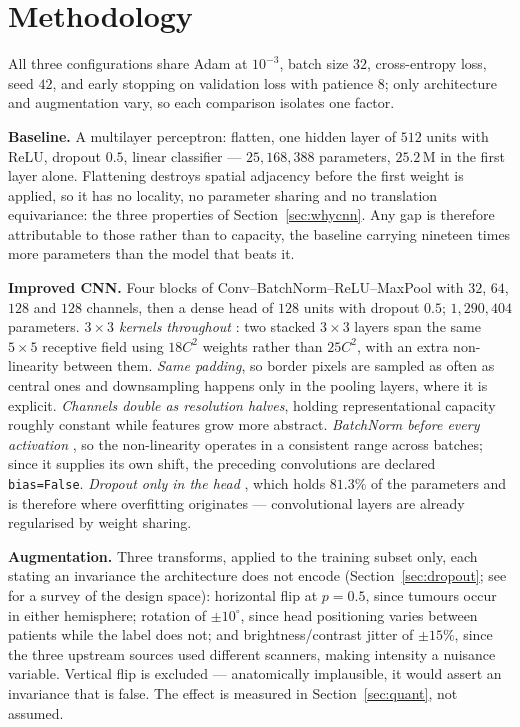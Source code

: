 \documentclass[10pt,a4paper]{article}
\begin{document}
\section{Methodology}
\label{sec:method}

All three configurations share Adam at $10^{-3}$, batch size $32$,
cross-entropy loss, seed $42$, and early stopping on validation loss with
patience $8$; only architecture and augmentation vary, so each comparison
isolates one factor.

\textbf{Baseline.} A multilayer perceptron: flatten, one hidden layer of $512$
units with ReLU, dropout $0.5$, linear classifier --- $25{,}168{,}388$
parameters, $25.2$\,M in the first layer alone. Flattening destroys spatial
adjacency before the first weight is applied, so it has no locality, no
parameter sharing and no translation equivariance: the three properties of
Section~\ref{sec:whycnn}. Any gap is therefore attributable to those rather than
to capacity, the baseline carrying nineteen times more parameters than the model
that beats it.

\textbf{Improved CNN.} Four blocks of Conv--BatchNorm--ReLU--MaxPool with $32$,
$64$, $128$ and $128$ channels, then a dense head of $128$ units with dropout
$0.5$; $1{,}290{,}404$ parameters. \emph{$3\times3$ kernels throughout}
\cite{simonyan}: two stacked $3\times3$ layers span the same $5\times5$
receptive field using $18C^2$ weights rather than $25C^2$, with an extra
non-linearity between them. \emph{Same padding}, so border pixels are sampled as
often as central ones and downsampling happens only in the pooling layers, where
it is explicit. \emph{Channels double as resolution halves}, holding
representational capacity roughly constant while features grow more abstract.
\emph{BatchNorm before every activation} \cite{ioffe}, so the non-linearity
operates in a consistent range across batches; since it supplies its own shift,
the preceding convolutions are declared \texttt{bias=False}. \emph{Dropout only
in the head} \cite{srivastava}, which holds $81.3\%$ of the parameters and is
therefore where overfitting originates --- convolutional layers are already
regularised by weight sharing.

\textbf{Augmentation.}
\label{sec:aug}
Three transforms, applied to the training subset only, each stating an
invariance the architecture does not encode (Section~\ref{sec:dropout}; see
\cite{shorten} for a survey of the design space):
horizontal flip at $p=0.5$, since tumours occur in either hemisphere; rotation
of $\pm10^{\circ}$, since head positioning varies between patients while the
label does not; and brightness/contrast jitter of $\pm15\%$, since the three
upstream sources used different scanners, making intensity a nuisance variable.
Vertical flip is excluded --- anatomically implausible, it would assert an
invariance that is false. The effect is measured in Section~\ref{sec:quant}, not
assumed.
\end{document}
